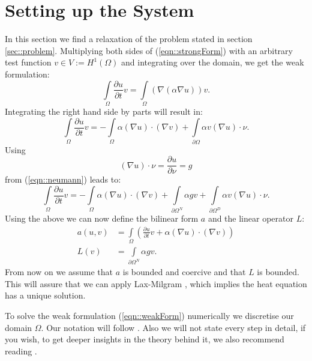 
\section{\label{sec::setupSystem}Setting up the System}
In this section we find a relaxation of the problem stated in section \ref{sec::problem}. Multiplying both sides of (\ref{eqn::strongForm}) with an arbitrary test function $v\in V:=H^1(\Omega)$ and integrating over the domain, we get the weak formulation:
\begin{equation*}
        \int\limits_{\Omega} \frac{\partial u}{\partial t} v = \int\limits_{\Omega} (\nabla(\alpha\nabla u)) v.
\end{equation*}
Integrating the right hand side by parts will result in:
\begin{equation*}
        \int\limits_{\Omega} \frac{\partial u}{\partial t} v = -\int\limits_{\Omega} \alpha(\nabla u) \cdot (\nabla v) + \int\limits_{\partial \Omega} \alpha v (\nabla u) \cdot \nu.
\end{equation*}
Using
\begin{equation*}
        (\nabla u)\cdot \nu = \frac{\partial u}{\partial \nu} = g
\end{equation*}
from (\ref{eqn::neumann}) leads to:
\begin{equation}
        \label{eqn::weakForm}
        \int\limits_{\Omega} \frac{\partial u}{\partial t} v = -\int\limits_{\Omega} \alpha(\nabla u) \cdot (\nabla v) +  \int\limits_{\partial\Omega^N} \alpha gv + \int\limits_{\partial \Omega^D} \alpha v (\nabla u) \cdot \nu.
\end{equation}
Using the above we can now define the bilinear form $a$ and the linear operator $L$:
\begin{align*}
        a(u,v)&=\int\limits_{\Omega} \left(\frac{\partial u}{\partial t} v +  \alpha(\nabla u) \cdot (\nabla v) \right) \\
        L(v) &= \int\limits_{\partial\Omega^N} \alpha gv.
\end{align*}
From now on we assume that $a$ is bounded and coercive and that $L$ is bounded. This will assure that we can apply Lax-Milgram \cite{quarteroni2009numerical}, which implies the heat equation has a unique solution.

To solve the weak formulation (\ref{eqn::weakForm}) numerically we discretise our domain $\Omega$. Our notation will follow \cite{quarteroni2009numerical}. Also we will not state every step in detail, if you wish, to get deeper insights in the theory behind it, we also recommend reading \cite{quarteroni2009numerical}.


